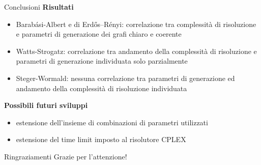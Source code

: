 \documentclass[a4paper]{beamer}
\begin{document}
\begin{frame}{Conclusioni}
\textbf{Risultati}\\

\begin{itemize}
\item Barabási-Albert e di Erdős–Rényi: correlazione tra complessità di risoluzione e parametri di generazione dei grafi chiaro e coerente
\item Watts-Strogatz: correlazione tra andamento della complessità di risoluzione e parametri di generazione individuata solo parzialmente
\item Steger-Wormald: nessuna correlazione tra parametri di generazione ed andamento della complessità di risoluzione individuata
\end{itemize}

\vfill

\textbf{Possibili futuri sviluppi}\\
\begin{itemize}
\item estensione dell'insieme di combinazioni di parametri utilizzati
\item estensione del time limit imposto al risolutore CPLEX 
\end{itemize}
\end{frame}

\begin{frame}{Ringraziamenti}
\centering
\LARGE Grazie per l'attenzione!
\end{frame}

\begin{frame}
	\maketitle
\end{frame}
\end{document}
